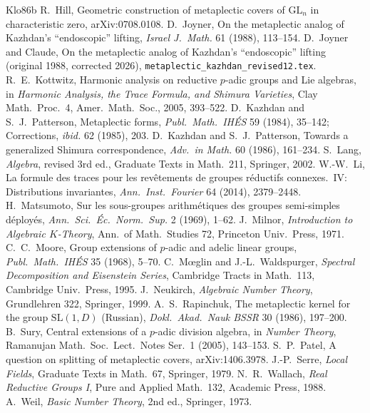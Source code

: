 \documentclass[12pt]{article}
\newcommand{\GL}{\mathrm{GL}}
\theoremstyle{plain}
\theoremstyle{definition}
\begin{document}
\begin{thebibliography}{Klo86b}
 R.~Hill, Geometric construction of metaplectic covers of $\GL_n$ in characteristic zero, arXiv:0708.0108.
 D.~Joyner, On the metaplectic analog of Kazhdan's ``endoscopic'' lifting, \emph{Israel J.\ Math.} 61 (1988), 113--154.
 D.~Joyner and Claude, On the metaplectic analog of Kazhdan's ``endoscopic'' lifting (original 1988, corrected 2026), \texttt{metaplectic\_kazhdan\_revised12.tex}.
 R.~E.~Kottwitz, Harmonic analysis on reductive $p$-adic groups and Lie algebras, in \emph{Harmonic Analysis, the Trace Formula, and Shimura Varieties}, Clay Math.\ Proc.\ 4, Amer.\ Math.\ Soc., 2005, 393--522.
 D.~Kazhdan and S.~J.~Patterson, Metaplectic forms, \emph{Publ.\ Math.\ IH\'ES} 59 (1984), 35--142; Corrections, \emph{ibid.} 62 (1985), 203.
 D.~Kazhdan and S.~J.~Patterson, Towards a generalized Shimura correspondence, \emph{Adv.\ in Math.} 60 (1986), 161--234.
 S.~Lang, \emph{Algebra}, revised 3rd ed., Graduate Texts in Math.\ 211, Springer, 2002.
 W.-W.~Li, La formule des traces pour les rev\^etements de groupes r\'eductifs connexes.\ IV: Distributions invariantes, \emph{Ann.\ Inst.\ Fourier} 64 (2014), 2379--2448.
 H.~Matsumoto, Sur les sous-groupes arithm\'etiques des groupes semi-simples d\'eploy\'es, \emph{Ann.\ Sci.\ \'Ec.\ Norm.\ Sup.} 2 (1969), 1--62.
 J.~Milnor, \emph{Introduction to Algebraic $K$-Theory}, Ann.\ of Math.\ Studies 72, Princeton Univ.\ Press, 1971.
 C.~C.~Moore, Group extensions of $p$-adic and adelic linear groups, \emph{Publ.\ Math.\ IH\'ES} 35 (1968), 5--70.
 C.~M\oe glin and J.-L.~Waldspurger, \emph{Spectral Decomposition and Eisenstein Series}, Cambridge Tracts in Math.\ 113, Cambridge Univ.\ Press, 1995.
 J.~Neukirch, \emph{Algebraic Number Theory}, Grundlehren 322, Springer, 1999.
 A.~S.~Rapinchuk, The metaplectic kernel for the group $\mathrm{SL}(1,D)$ (Russian), \emph{Dokl.\ Akad.\ Nauk BSSR} 30 (1986), 197--200.
 B.~Sury, Central extensions of a $p$-adic division algebra, in \emph{Number Theory}, Ramanujan Math.\ Soc.\ Lect.\ Notes Ser.\ 1 (2005), 143--153.
 S.~P.~Patel, A question on splitting of metaplectic covers, arXiv:1406.3978.
 J.-P.~Serre, \emph{Local Fields}, Graduate Texts in Math.\ 67, Springer, 1979.
 N.~R.~Wallach, \emph{Real Reductive Groups I}, Pure and Applied Math.\ 132, Academic Press, 1988.
 A.~Weil, \emph{Basic Number Theory}, 2nd ed., Springer, 1973.

\end{thebibliography}
\end{document}
